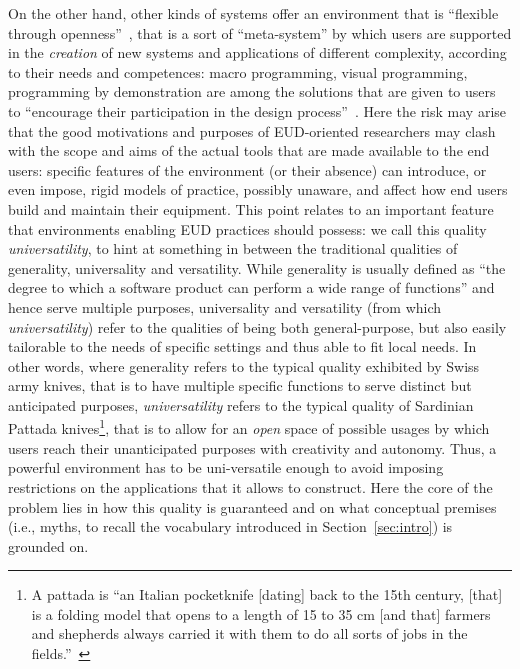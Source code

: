 \documentclass{article}
\begin{document}
On the other hand, other kinds of systems offer an environment that is ``flexible through openness''~\citep{dourish_evolution_1999}, that is a sort of ``meta-system'' by which users are supported in the \emph{creation} of new systems and applications of different complexity, according to their needs and competences: macro programming, visual programming, programming by demonstration are among the solutions that are given to users to ``encourage their participation in the design process''~\citep[p. 170]{dourish_where_2001}. Here the risk may arise that the good motivations and purposes of EUD-oriented researchers may clash with the scope and aims of the actual tools that are made available to the end users: specific features of the environment (or their absence) can introduce, or even impose, rigid models of practice, possibly unaware, and affect how end users build and maintain their equipment. This point relates to an important feature that environments enabling EUD practices should possess: we call this quality \emph{universa\emph{ti}lity}, to hint at something in between the traditional qualities of generality, universality and versatility. While generality is usually defined as ``the degree to which a software product can perform a wide range of functions''\citep{khosravi_quality_2004} and hence serve multiple purposes, universality and versatility (from which \emph{universatility}) refer to the qualities of being both general-purpose, but also easily tailorable to the needs of specific settings and thus able to fit local needs. In other words, where generality refers to the typical quality exhibited by Swiss army knives, that is to have multiple specific functions to serve distinct but anticipated purposes, \emph{universatility} refers to the typical quality of Sardinian Pattada knives\footnote{A pattada is ``an Italian pocketknife [dating] back to the 15th century, [that] is a folding model that opens to a length of 15 to 35 cm [and that] farmers and shepherds always carried it with them to do all sorts of jobs in the fields.''~\citep{de_michelis_swiss_2003}}, that is to allow for an \emph{open} space of possible usages by which users reach their unanticipated purposes with creativity and autonomy. Thus, a powerful environment has to be uni-versatile enough to avoid imposing restrictions on the applications that it allows to construct. Here the core of the problem lies in how this quality is guaranteed and on what conceptual premises (i.e., myths, to recall the vocabulary introduced in Section~\ref{sec:intro}) is grounded on.  
\end{document}
